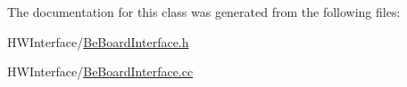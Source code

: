 The documentation for this class was generated from the following files\-:\begin{DoxyCompactItemize}
\item 
H\-W\-Interface/\hyperlink{_be_board_interface_8h}{Be\-Board\-Interface.\-h}\item 
H\-W\-Interface/\hyperlink{_be_board_interface_8cc}{Be\-Board\-Interface.\-cc}\end{DoxyCompactItemize}
